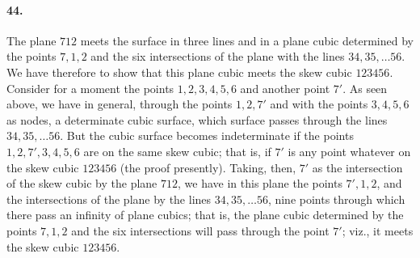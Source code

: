 \documentclass[11pt,a4paper]{article}
\begin{document}
\paragraph{44.}
The plane $712$ meets the surface in three lines and in a plane cubic determined by the
points $7, 1, 2$ and the six intersections of the plane with the lines $34, 35, \ldots 56$.
We have therefore to show that this plane cubic meets the skew cubic $123456$. Consider for
a moment the points $1, 2, 3, 4, 5, 6$ and another point $7'$. As seen above, we have in
general, through the points $1, 2, 7'$ and with the points $3, 4, 5, 6$ as nodes, a
determinate cubic surface, which surface passes through the lines $34, 35, \ldots 56$. But
the cubic surface becomes indeterminate if the points $1, 2, 7', 3, 4, 5, 6$ are on the
same skew cubic; that is, if $7'$ is any point whatever on the skew cubic $123456$ (the
proof presently). Taking, then, $7'$ as the intersection of the skew cubic by the plane
$712$, we have in this plane the points $7', 1, 2$, and the intersections of the plane by
the lines $34, 35, \ldots 56$, nine points through which there pass an infinity of plane
cubics; that is, the plane cubic determined by the points $7, 1, 2$ and the six
intersections will pass through the point $7'$; viz., it meets the skew cubic $123456$.
\end{document}

